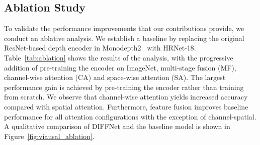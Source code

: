 \documentclass{bmvc2k}
\begin{document}
\subsection{Ablation Study}\label{sec:ablation}
To validate the performance improvements that our contributions provide, we conduct an ablative analysis.
We establish a baseline by replacing the original ResNet-based depth encoder in Monodepth2~\cite{monodepth2} with HRNet-18. Table~\ref{tab:ablation} shows the results of the analysis,
with the progressive addition of pre-training the encoder on ImageNet, multi-stage fusion (MF), channel-wise attention (CA) and space-wise attention (SA). 
The largest performance gain is achieved by pre-training the encoder rather than training from scratch.
We observe that channel-wise attention yields increased accuracy compared with spatial attention. 
Furthermore, feature fusion improves baseline performance for all attention configurations with the exception of channel-spatial. 
A qualitative comparison of DIFFNet and the baseline model is shown in Figure~\ref{fig:viausal_ablation}.
\begin{table*}[ht]
\caption{\bf{Ablation Studies.} MF: Multi-stage Fusion. CA: Channel-wise Attention. SA: Space-wise Attention. Red check marks identify our final system.}
\label{tab:ablation}
\centering
\setlength
{}
\end{table*}
\end{document}

